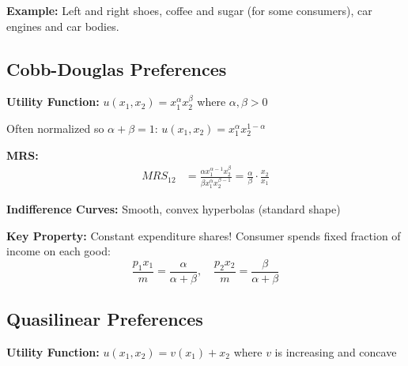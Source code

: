 \documentclass[11pt,a4paper]{article}
\begin{document}
\textbf{Example:} Left and right shoes, coffee and sugar (for some consumers), car engines and car bodies.

\subsection{Cobb-Douglas Preferences}

\textbf{Utility Function:} $u(x_1, x_2) = x_1^\alpha x_2^\beta$ where $\alpha, \beta > 0$

Often normalized so $\alpha + \beta = 1$: $u(x_1, x_2) = x_1^\alpha x_2^{1-\alpha}$

\textbf{MRS:}
\begin{align*}
MRS_{12} &= \frac{\alpha x_1^{\alpha-1}x_2^\beta}{\beta x_1^\alpha x_2^{\beta-1}} = \frac{\alpha}{\beta}\cdot\frac{x_2}{x_1}
\end{align*}

\textbf{Indifference Curves:} Smooth, convex hyperbolas (standard shape)

\begin{center}
\end{center}

\textbf{Key Property:} Constant expenditure shares! Consumer spends fixed fraction of income on each good:
\[
\frac{p_1 x_1}{m} = \frac{\alpha}{\alpha + \beta}, \quad \frac{p_2 x_2}{m} = \frac{\beta}{\alpha + \beta}
\]

\subsection{Quasilinear Preferences}

\textbf{Utility Function:} $u(x_1, x_2) = v(x_1) + x_2$ where $v$ is increasing and concave
\end{document}

